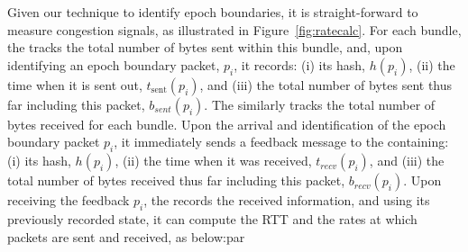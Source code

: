 Given our technique to identify epoch boundaries, it is straight-forward to measure congestion signals, as illustrated in Figure~\ref{fig:ratecalc}.
For each bundle, the \inbox tracks the total number of bytes sent within this bundle, and, upon identifying an epoch boundary packet, $p_i$, it records: (i) its hash, $h(p_i)$, (ii) the time when it is sent out, $t_{\text{sent}}(p_i)$, and (iii) the total number of bytes sent thus far including this packet, $b_{sent}(p_i)$. 
The \outbox similarly tracks the total number of bytes received for each bundle. Upon the arrival and identification of the epoch boundary packet $p_i$, it immediately sends a feedback message to the \inbox containing: (i) its hash, $h(p_i)$, (ii) the time when it was received, $t_{recv}(p_i)$, and (iii) the total number of bytes received thus far including this packet, $b_{recv}(p_i)$. 
Upon receiving the feedback $p_i$, the \inbox records the received information, and using its previously recorded state, it can compute the RTT and the rates at which packets are sent and received, as below:par

